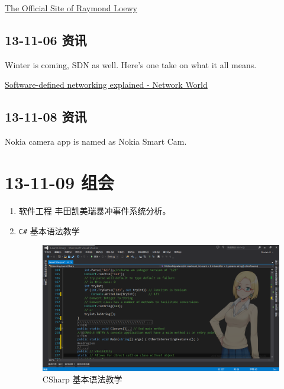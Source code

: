 \documentclass[]{report}
\begin{document}
		\href{www.raymondloewy.com/}{The Official Site of Raymond Loewy}‎
		
	\subsection{13-11-06 资讯}
		Winter is coming, SDN as well. Here's one take on what it all means.
		
		\href{http://ow.ly/qy9Ei}{Software-defined networking explained - Network World}
	
	\subsection{13-11-08 资讯}
		Nokia camera app is named as Nokia Smart Cam.
		
\section{13-11-09 组会}
\begin{enumerate}
	\item 软件工程
		丰田凯美瑞暴冲事件系统分析。
	\item \verb|C#| 基本语法教学
\begin{figure}
\centering
\includegraphics[width=1\linewidth]{./PIC/LearnCSharp}
\caption{CSharp 基本语法教学}
\label{fig:LearnCSharp}
\end{figure}
\end{enumerate}
\end{document}
